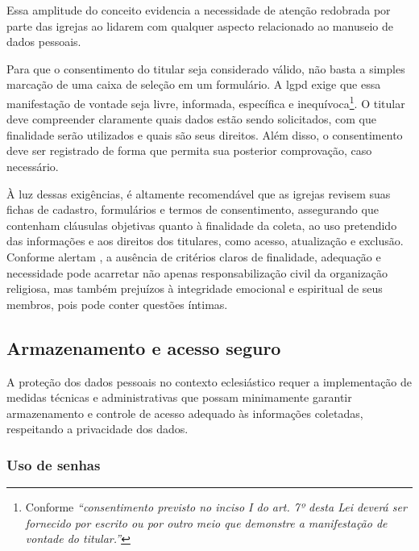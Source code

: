 Essa amplitude do conceito evidencia a necessidade de atenção redobrada por parte das igrejas ao lidarem com qualquer aspecto relacionado ao manuseio de dados pessoais.

Para que o consentimento do titular seja considerado válido, não basta a simples marcação de uma caixa de seleção em um formulário. A \gls{lgpd} exige que essa manifestação de vontade seja livre, informada, específica e inequívoca\footnote{Conforme  \textit{``consentimento previsto no inciso I do art. 7º desta Lei deverá ser fornecido por escrito ou por outro meio que demonstre a manifestação de vontade do titular.''}}. O titular deve compreender claramente quais dados estão sendo solicitados, com que finalidade serão utilizados e quais são seus direitos. Além disso, o consentimento deve ser registrado de forma que permita sua posterior comprovação, caso necessário.

À luz dessas exigências, é altamente recomendável que as igrejas revisem suas fichas de cadastro, formulários e termos de consentimento, assegurando que contenham cláusulas objetivas quanto à finalidade da coleta, ao uso pretendido das informações e aos direitos dos titulares, como acesso, atualização e exclusão. Conforme alertam , a ausência de critérios claros de finalidade, adequação e necessidade pode acarretar não apenas responsabilização civil da organização religiosa, mas também prejuízos à integridade emocional e espiritual de seus membros, pois pode conter questões íntimas.

\subsection{Armazenamento e acesso seguro}

A proteção dos dados pessoais no contexto eclesiástico requer a implementação de medidas técnicas e administrativas que possam minimamente garantir armazenamento e controle de acesso adequado às informações coletadas, respeitando a privacidade dos dados.

\subsubsection{Uso de senhas}

